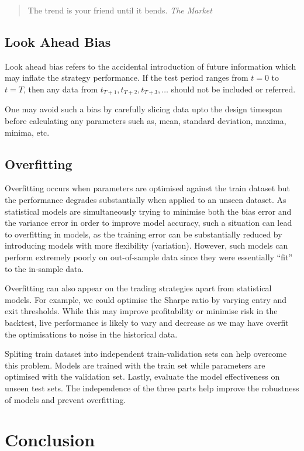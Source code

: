 \documentclass[12pt]{article}
\begin{document}
\begin{quote}
  The trend is your friend until it bends.
  \textit{The Market}
\end{quote}

\subsection{Look Ahead Bias}

Look ahead bias refers to the accidental introduction of future information which may inflate the strategy performance. If the test period ranges from $t=0$ to $t=T$, then any data from $t_{T+1}, t_{T+2}, t_{T+3}, \dots$ should not be included or referred.

One may avoid such a bias by carefully slicing data upto the design timespan before calculating any parameters such as, mean, standard deviation, maxima, minima, etc.

\subsection{Overfitting}

Overfitting occurs when parameters are optimised against the train dataset but the performance degrades substantially when applied to an unseen dataset. As statistical models are simultaneously trying to minimise both the bias error and the variance error in order to improve model accuracy, such a situation can lead to overfitting in models, as the training error can be substantially reduced by introducing models with more flexibility (variation). However, such models can perform extremely poorly on out-of-sample data since they were essentially “fit” to the in-sample data.

Overfitting can also appear on the trading strategies apart from statistical models. For example, we could optimise the Sharpe ratio by varying entry and exit thresholds. While this may improve profitability or minimise risk in the backtest, live performance is likely to vary and decrease as we may have overfit the optimisations to noise in the historical data.

Spliting train dataset into independent train-validation sets can help overcome this problem. Models are trained with the train set while parameters are optimised with the validation set. Lastly, evaluate the model effectiveness on unseen test sets. The independence of the three parts help improve the robustness of models and prevent overfitting.

\section*{Conclusion}
\end{document}
